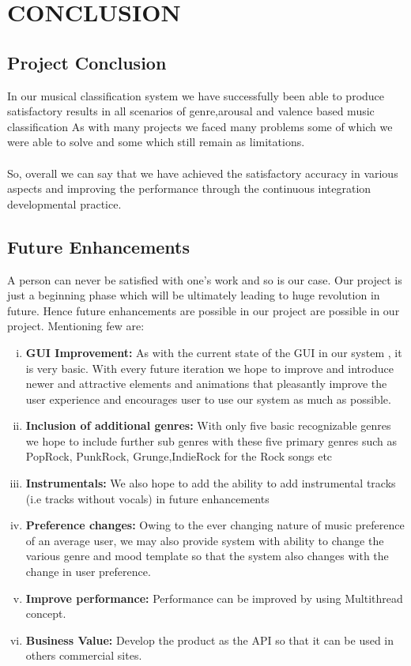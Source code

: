 \newpage
\newpage
\newpage
\newpage
\newpage
\newpage
\newpage

\section{CONCLUSION}
\subsection{Project Conclusion}
In our musical classification system we have successfully been able to produce satisfactory 
results in all scenarios of genre,arousal and valence based music classification 
As with many projects we faced many problems some of which we were able to solve and some 
which still remain as limitations.\\ 
\\ 
So, overall we can say that we have achieved the satisfactory accuracy in various aspects and 
improving the performance through the continuous integration developmental practice. 
\subsection{Future Enhancements}
A person can never be satisfied with one's work and so is our case. Our project is just a beginning phase which will be ultimately leading to 
huge revolution in future. Hence future enhancements are possible in our project are possible in our project. Mentioning few are:   
\begin{enumerate}[(i)]
        \item \textbf{GUI Improvement:}
                As with the current state of the GUI in our system , it is very basic. With every future iteration we 
                hope to improve and introduce newer and attractive elements and animations that pleasantly 
                improve the user experience and encourages user to use our system as much as possible. 
        \item \textbf{Inclusion of additional genres:}
                With only five basic recognizable genres we hope to 
                include further sub genres with these five primary genres such as Pop­Rock, Punk­Rock, 
                Grunge,Indie­Rock for the Rock songs etc 
        \item \textbf{Instrumentals:}
                We also hope to add the ability to add instrumental tracks (i.e tracks 
                without vocals) in future enhancements 
        \item \textbf{Preference changes:}
                Owing to the ever changing nature of music preference of an 
                average user, we may also provide system with ability to change the various genre and 
                mood template so that the system also changes with the change in user preference. 
        \item \textbf{Improve performance:}
                Performance can be improved by using Multi­thread concept. 
        \item \textbf{Business Value:}
        Develop the product as the API so that it can be used in others 
        commercial sites. 
        \end{enumerate}
